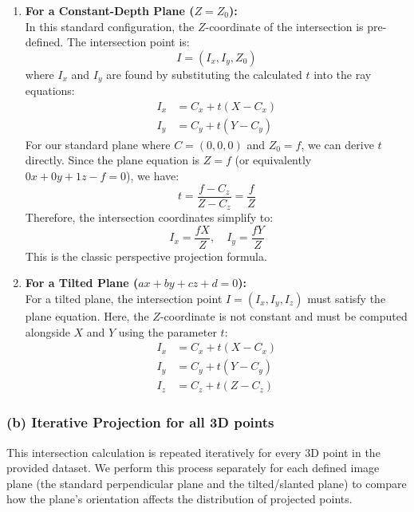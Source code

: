 \documentclass[12pt]{article}
\begin{document}
\begin{enumerate}
    \item \textbf{For a Constant-Depth Plane ($Z = Z_0$):} \\
    In this standard configuration, the $Z$-coordinate of the intersection is pre-defined. The intersection point is:
    \begin{equation}
        I = (I_x, I_y, Z_0)
    \end{equation}
    where $I_x$ and $I_y$ are found by substituting the calculated $t$ into the ray equations:
    \begin{align}
        I_x &= C_x + t(X - C_x) \\
        I_y &= C_y + t(Y - C_y)
    \end{align}
    For our standard plane where $C = (0,0,0)$ and $Z_0 = f$, we can derive $t$ directly. Since the plane equation is $Z = f$ (or equivalently $0x + 0y + 1z - f = 0$), we have:
    \[
    t = \frac{f - C_z}{Z - C_z} = \frac{f}{Z}
    \]
    Therefore, the intersection coordinates simplify to:
    \[
    I_x = \frac{fX}{Z}, \quad I_y = \frac{fY}{Z}
    \]
    This is the classic perspective projection formula.

    \item \textbf{For a Tilted Plane ($ax + by + cz + d = 0$):} \\
    For a tilted plane, the intersection point $I = (I_x, I_y, I_z)$ must satisfy the plane equation. Here, the $Z$-coordinate is not constant and must be computed alongside $X$ and $Y$ using the parameter $t$:
    \begin{align}
        I_x &= C_x + t(X - C_x) \\
        I_y &= C_y + t(Y - C_y) \\
        I_z &= C_z + t(Z - C_z)
    \end{align}
\end{enumerate}

\subsubsection*{(b) Iterative Projection for all 3D points}

This intersection calculation is repeated iteratively for every 3D point in the provided dataset. We perform this process separately for each defined image plane (the standard perpendicular plane and the tilted/slanted plane) to compare how the plane's orientation affects the distribution of projected points.
\end{document}
